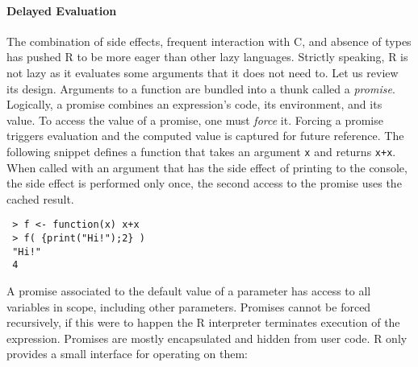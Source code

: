 \documentclass[review,creen,acmsmall]{acmart}
\renewcommand{\c}[1]{\lstinline |#1|\xspace}
\begin{document}
\paragraph{Delayed Evaluation}
The combination of side effects, frequent interaction with C, and absence of
types has pushed R to be more eager than other lazy languages. Strictly
speaking, R is not lazy as it evaluates some arguments that it does not need to.
Let us review its design. Arguments to a function are bundled into a thunk
called a \emph{promise}. Logically, a promise combines an expression's code, its
environment, and its value. To access the value of a promise, one must
\emph{force} it. Forcing a promise triggers evaluation and the computed value is
captured for future reference. The following snippet defines a function that
takes an argument \c x and returns \c{x+x}. When called with an argument
that has the side effect of printing to the console, the side effect is
performed only once, the second access to the promise uses the cached result.

\begin{lstlisting}
 > f <- function(x) x+x
 > f( {print("Hi!");2} )
 "Hi!"
 4
\end{lstlisting}


A promise associated to the default value of a parameter has access to all
variables in scope, including other parameters. Promises cannot be forced
recursively, if this were to happen the R interpreter terminates execution of
the expression. Promises are mostly encapsulated and hidden from user code. R
only provides a small interface for operating on them:
\end{document}
